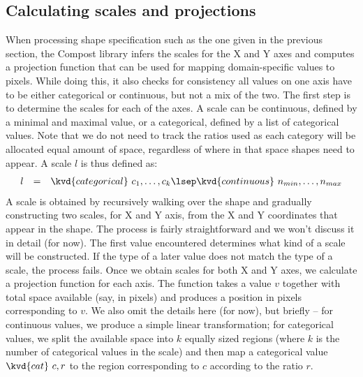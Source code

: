 \documentclass{jfp}
\begin{document}
{\subsection*{Calculating scales and projections}
When processing shape specification such as the one given in the previous section, the Compost
library infers the scales for the X and Y axes and computes a projection function that can be
used for mapping domain-specific values to pixels. While doing this, it also checks for consistency %
all values on one axis have to be either categorical or continuous, but not a mix of the two.
The first step is to determine the scales for each of the axes. A scale can be continuous,
defined by a minimal and maximal value, or a categorical, defined by a list of categorical values.
Note that we do not need to track the ratios used as each category
will be allocated equal amount of space, regardless of where in that space shapes need to
appear. A scale $l$ is thus defined as:
%
\begin{equation*}
\begin{array}{rcl}
l & = & \kvd{categorical}~c_1, \ldots, c_k \lsep \kvd{continuous}~n_{min}, \ldots, n_{max}
\end{array}
\end{equation*}
%
A scale is obtained by recursively walking over the shape and gradually constructing two scales,
for X and Y axis, from the X and Y coordinates that appear in the shape. The process is fairly
straightforward and we won't discuss it in detail (for now). The first value encountered determines
what kind of a scale will be constructed. If the type of a later value does not match the type of a
scale, the process fails.
Once we obtain scales for both X and Y axes, we calculate a projection function for each axis.
The function takes a value $v$ together with total space available (say, in pixels) and produces
a position in pixels corresponding to $v$. We also omit the details here (for now), but briefly --
for continuous values, we produce a simple linear transformation; for categorical values, we split
the available space into $k$ equally sized regions (where $k$ is the number of categorical values
in the scale) and then map a categorical value $\kvd{cat}~c, r$ to the region corresponding to $c$
according to the ratio $r$.
}
\end{document}
